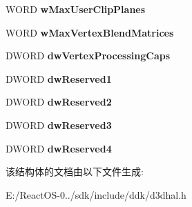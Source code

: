 \begin{DoxyCompactItemize}
W\+O\+RD {\bfseries w\+Max\+User\+Clip\+Planes}
\item 
\mbox{\label{struct___d3_d_h_a_l___d3_d_e_x_t_e_n_d_e_d_c_a_p_s_a288336444cf5e11e730c6f6a7faf44be}} 
W\+O\+RD {\bfseries w\+Max\+Vertex\+Blend\+Matrices}
\item 
\mbox{\label{struct___d3_d_h_a_l___d3_d_e_x_t_e_n_d_e_d_c_a_p_s_a539e60dd7276bf6d852e309f593b0e82}} 
D\+W\+O\+RD {\bfseries dw\+Vertex\+Processing\+Caps}
\item 
\mbox{\label{struct___d3_d_h_a_l___d3_d_e_x_t_e_n_d_e_d_c_a_p_s_a92f72ffca342540e304b8addab0aadaf}} 
D\+W\+O\+RD {\bfseries dw\+Reserved1}
\item 
\mbox{\label{struct___d3_d_h_a_l___d3_d_e_x_t_e_n_d_e_d_c_a_p_s_a0d966fb4ff0ee163b84663dd2aff3bda}} 
D\+W\+O\+RD {\bfseries dw\+Reserved2}
\item 
\mbox{\label{struct___d3_d_h_a_l___d3_d_e_x_t_e_n_d_e_d_c_a_p_s_a87a238edab7ce08ced93f1df394a4b25}} 
D\+W\+O\+RD {\bfseries dw\+Reserved3}
\item 
\mbox{\label{struct___d3_d_h_a_l___d3_d_e_x_t_e_n_d_e_d_c_a_p_s_a9ce01e06e8e9923781eccc8c782b6618}} 
D\+W\+O\+RD {\bfseries dw\+Reserved4}
\end{DoxyCompactItemize}


该结构体的文档由以下文件生成\+:\begin{DoxyCompactItemize}
\item 
E\+:/\+React\+O\+S-\/0../sdk/include/ddk/d3dhal.\+h\end{DoxyCompactItemize}
